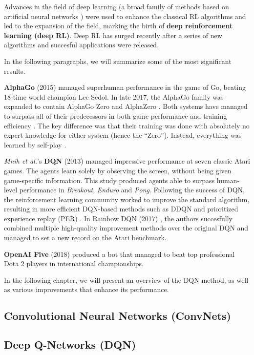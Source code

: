 Advances in the field of deep learning (a broad family of methods based on artificial neural networks \cite{wiki:Deep_learning}) were used to enhance the classical RL algorithms and led to the expansion of the field, marking the birth of \textbf{deep reinforcement learning (deep RL)}.
Deep RL has surged recently after a series of new algorithms and succesful applications were released.

In the following paragraphs, we will summarize some of the most significant results.

\textbf{AlphaGo} (2015) \cite{ago} managed superhuman performance in the game of Go, beating 18-time world champion Lee Sedol.
In late 2017, the AlphaGo family was expanded to contain AlphaGo Zero and AlphaZero \cite{alpha-zero}.
Both systems have managed to surpass all of their predecessors in both game performance and training efficiency \cite{wiki:AlphaGo}.
The key difference was that their training was done with absolutely no expert knowledge for either system (hence the ``Zero'').
Instead, everything was learned by self-play \cite{alpha-zero}.

\textit{Mnih et al.}'s \textbf{DQN} \cite{atari-dqn} (2013) managed impressive performance at seven classic Atari games.
The agents learn solely by observing the screen, without being given game-specific information.
This study produced agents able to surpass human-level performance in \emph{Breakout}, \emph{Enduro} and \emph{Pong}.
Following the success of DQN, the reinforcement learning community worked to improve the standard algorithm, resulting in more efficient DQN-based methods such as DDQN \cite{ddqn-paper} and prioritized experience replay (PER) \cite{per-paper}.
In Rainbow DQN (2017) \cite{rainbow-dqn}, the authors succesfully combined multiple high-quality improvement methods over the original DQN and managed to set a new record on the Atari benchmark.

\textbf{OpenAI Five} \cite{openai-dota} (2018) produced a bot that managed to beat top professional Dota 2 players in international championships.

In the following chapter, we will present an overview of the DQN method, as well as various improvements that enhance its performance.

\subsection{Convolutional Neural Networks (ConvNets)}

\subsection{Deep Q-Networks (DQN)}

